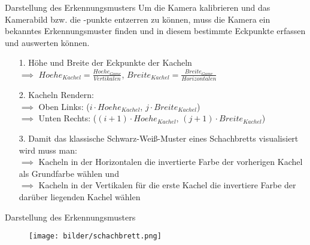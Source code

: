 \begin{frame}{Darstellung des Erkennungsmusters}
	Um die Kamera kalibrieren und das Kamerabild bzw. die -punkte entzerren zu können, muss die Kamera ein bekanntes Erkennungsmuster finden und in diesem bestimmte Eckpunkte erfassen und auswerten können.
	\pause
	\begin{itemize}
		\item[1.] Höhe und Breite der Eckpunkte der Kacheln\\
		\pause
		$\implies$ $Hoehe_{Kachel} = \frac{Hoehe_{Game}}{Vertikalen}$, $Breite_{Kachel} = \frac{Breite_{Game}}{Horizontalen}$\\
		\pause
		\item[2.] Kacheln Rendern:\\
				$\implies$ Oben Links: ($i \cdot Hoehe_{Kachel}$, $j \cdot Breite_{Kachel}$)\\
				$\implies$ Unten Rechts: ($(i+1) \cdot Hoehe_{Kachel}$, $(j+1) \cdot Breite_{Kachel}$)\\
		\pause
		\item[3.] Damit das klassische Schwarz-Weiß-Muster eines Schachbretts visualisiert wird muss man:\\
		$\implies$ Kacheln in der Horizontalen die invertierte Farbe der vorherigen Kachel als Grundfarbe wählen und \\
		$\implies$ Kacheln in der Vertikalen für die erste Kachel die invertiere Farbe der darüber liegenden Kachel wählen
	\end{itemize}
\end{frame}
\begin{frame}{Darstellung des Erkennungsmusters}
	\begin{figure}[h]
		\centering
		\texttt{[image: bilder/schachbrett.png]}
	\end{figure}

\end{frame}



